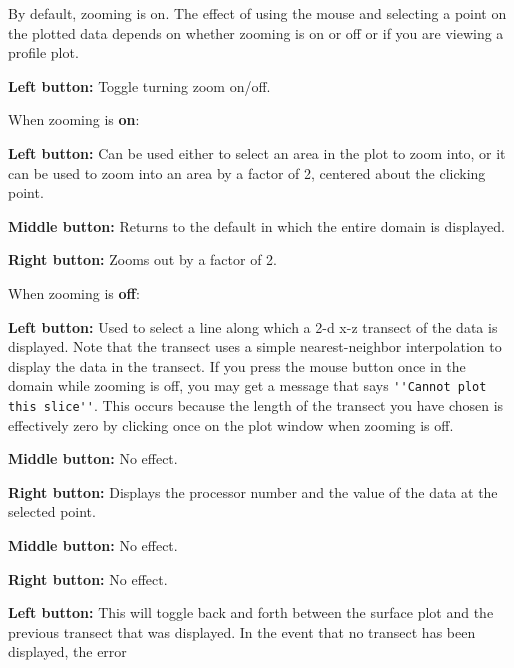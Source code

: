 \documentclass[12pt,oneside]{article}
\begin{document}
By default, zooming is on.  The effect of using the mouse and selecting a point on the
plotted data depends on whether zooming is on or off or if you are viewing a profile plot.
\begin{list}{}
\item {}
\begin{list}{}
\item {\bf Left button:} Toggle turning zoom on/off.  
\begin{list}{}
\item When zooming is {\bf on}:
\begin{list}{}
\item {\bf Left button:}  Can be used either to select an area in the plot to zoom into, or
it can be used to zoom into an area by a factor of 2, centered about the clicking point.
\item {\bf Middle button:} Returns to the default in which the entire domain is displayed.
\item {\bf Right button:} Zooms out by a factor of 2.
\end{list}
\item When zooming is {\bf off}:
\begin{list}{}
\item {\bf Left button:}  Used to select a line along which a 2-d x-z transect of the data
is displayed.  Note that the transect uses a simple nearest-neighbor interpolation to
display the data in the transect.  If you press the mouse button once in the domain
while zooming is off, you may get a message that says \verb+''Cannot plot this slice''+.
This occurs because the length of the transect you have chosen is effectively zero by
clicking once on the plot window when zooming is off.
\item {\bf Middle button:} No effect.
\item {\bf Right button:} Displays the processor number and the value of the data at the selected point.
\end{list}
\end{list}
\item {\bf Middle button:} No effect.
\item {\bf Right button:} No effect.
\end{list}
\item {}
\begin{list}{}
\item {\bf Left button:} This will toggle back and forth between the surface plot and the previous
transect that was displayed.  In the event that no transect has been displayed, the error

\end{list}
\end{list}
\end{document}
